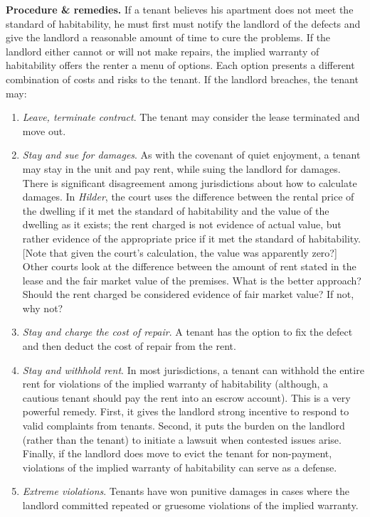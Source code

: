 \item \textbf{Procedure \& remedies.} If a tenant believes his apartment does
not meet the standard of habitability, he must first must notify the landlord
of the defects and give the landlord a reasonable amount of time to cure the
problems.  If the landlord either cannot or will not make repairs, the implied
warranty of habitability offers the renter a menu of options.  Each option
presents a different combination of costs and risks to the tenant. If the
landlord breaches, the tenant may:
\begin{enumerate}
\item \textit{Leave, terminate contract}.  The tenant may consider the lease
terminated and move out.  
\item \textit{Stay and sue for damages}. As with the covenant of quiet
enjoyment, a tenant may stay in the unit and pay rent, while suing the landlord
for damages.  There is significant disagreement among jurisdictions about how
to calculate damages.  In \textit{Hilder}, the court uses the difference
between the rental price of the dwelling if it met the standard of habitability
and the value of the dwelling as it exists; the rent charged is not evidence of
actual value, but rather evidence of the appropriate price if it met the
standard of habitability.  [Note that given the court's calculation, the value
was apparently zero?] Other courts look at the difference between the amount of
rent stated in the lease and the fair market value of the premises.  What is
the better approach?  Should the rent charged be considered evidence of fair
market value?  If not, why not?
\item \textit{Stay and charge the cost of repair}.  A tenant has the option to
fix the defect and then deduct the cost of repair from the rent.  
\item \textit{Stay and withhold rent}.  In most jurisdictions, a tenant can
withhold the entire rent for violations of the implied warranty of habitability
(although, a cautious tenant should pay the rent into an escrow account).  This
is a very powerful remedy.  First, it gives the landlord strong incentive to
respond to valid complaints from tenants.  Second, it puts the burden on the
landlord (rather than the tenant) to initiate a lawsuit when contested issues
arise.  Finally, if the landlord does move to evict the tenant for non-payment,
violations of the implied warranty of habitability can serve as a defense.
\item \textit{Extreme violations}.  Tenants have won punitive damages in cases
where the landlord committed repeated or gruesome violations of the implied
warranty.  
\end{enumerate}

